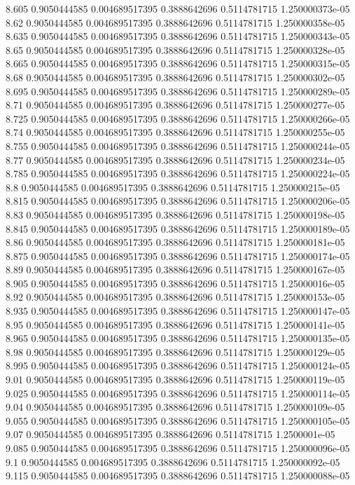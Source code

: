 {8.605 0.9050444585 0.004689517395 0.3888642696 0.5114781715 1.250000373e-05
8.62 0.9050444585 0.004689517395 0.3888642696 0.5114781715 1.250000358e-05
8.635 0.9050444585 0.004689517395 0.3888642696 0.5114781715 1.250000343e-05
8.65 0.9050444585 0.004689517395 0.3888642696 0.5114781715 1.250000328e-05
8.665 0.9050444585 0.004689517395 0.3888642696 0.5114781715 1.250000315e-05
8.68 0.9050444585 0.004689517395 0.3888642696 0.5114781715 1.250000302e-05
8.695 0.9050444585 0.004689517395 0.3888642696 0.5114781715 1.250000289e-05
8.71 0.9050444585 0.004689517395 0.3888642696 0.5114781715 1.250000277e-05
8.725 0.9050444585 0.004689517395 0.3888642696 0.5114781715 1.250000266e-05
8.74 0.9050444585 0.004689517395 0.3888642696 0.5114781715 1.250000255e-05
8.755 0.9050444585 0.004689517395 0.3888642696 0.5114781715 1.250000244e-05
8.77 0.9050444585 0.004689517395 0.3888642696 0.5114781715 1.250000234e-05
8.785 0.9050444585 0.004689517395 0.3888642696 0.5114781715 1.250000224e-05
8.8 0.9050444585 0.004689517395 0.3888642696 0.5114781715 1.250000215e-05
8.815 0.9050444585 0.004689517395 0.3888642696 0.5114781715 1.250000206e-05
8.83 0.9050444585 0.004689517395 0.3888642696 0.5114781715 1.250000198e-05
8.845 0.9050444585 0.004689517395 0.3888642696 0.5114781715 1.250000189e-05
8.86 0.9050444585 0.004689517395 0.3888642696 0.5114781715 1.250000181e-05
8.875 0.9050444585 0.004689517395 0.3888642696 0.5114781715 1.250000174e-05
8.89 0.9050444585 0.004689517395 0.3888642696 0.5114781715 1.250000167e-05
8.905 0.9050444585 0.004689517395 0.3888642696 0.5114781715 1.25000016e-05
8.92 0.9050444585 0.004689517395 0.3888642696 0.5114781715 1.250000153e-05
8.935 0.9050444585 0.004689517395 0.3888642696 0.5114781715 1.250000147e-05
8.95 0.9050444585 0.004689517395 0.3888642696 0.5114781715 1.250000141e-05
8.965 0.9050444585 0.004689517395 0.3888642696 0.5114781715 1.250000135e-05
8.98 0.9050444585 0.004689517395 0.3888642696 0.5114781715 1.250000129e-05
8.995 0.9050444585 0.004689517395 0.3888642696 0.5114781715 1.250000124e-05
9.01 0.9050444585 0.004689517395 0.3888642696 0.5114781715 1.250000119e-05
9.025 0.9050444585 0.004689517395 0.3888642696 0.5114781715 1.250000114e-05
9.04 0.9050444585 0.004689517395 0.3888642696 0.5114781715 1.250000109e-05
9.055 0.9050444585 0.004689517395 0.3888642696 0.5114781715 1.250000105e-05
9.07 0.9050444585 0.004689517395 0.3888642696 0.5114781715 1.2500001e-05
9.085 0.9050444585 0.004689517395 0.3888642696 0.5114781715 1.250000096e-05
9.1 0.9050444585 0.004689517395 0.3888642696 0.5114781715 1.250000092e-05
9.115 0.9050444585 0.004689517395 0.3888642696 0.5114781715 1.250000088e-05
}
